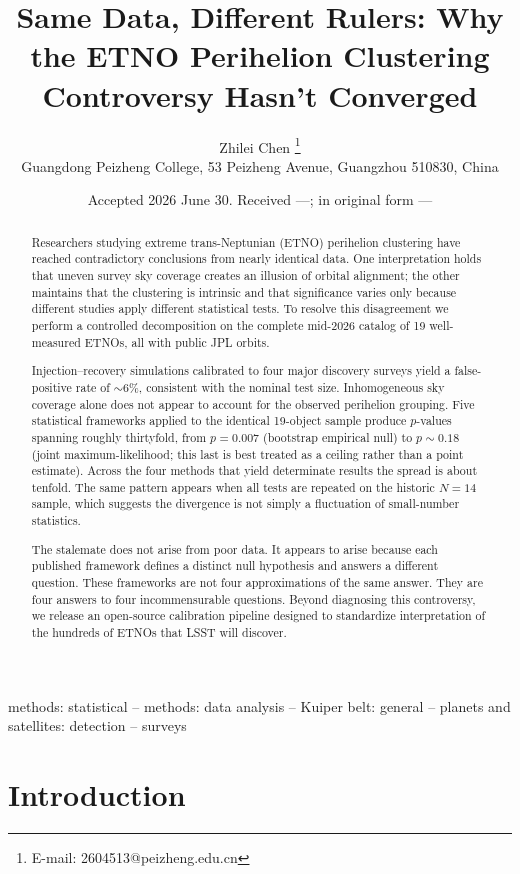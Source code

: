 \documentclass[usenatbib]{mnras}
\title{Same Data, Different Rulers: Why the ETNO Perihelion Clustering Controversy Hasn't Converged}
\author{Zhilei Chen%
\thanks{E-mail: 2604513@peizheng.edu.cn}%
\\
Guangdong Peizheng College, 53 Peizheng Avenue, Guangzhou 510830, China}
\date{Accepted 2026 June 30. Received ---; in original form ---}
\begin{document}
\maketitle

\begin{abstract}
Researchers studying extreme trans-Neptunian (ETNO) perihelion clustering have reached contradictory conclusions from nearly identical data. One interpretation holds that uneven survey sky coverage creates an illusion of orbital alignment; the other maintains that the clustering is intrinsic and that significance varies only because different studies apply different statistical tests. To resolve this disagreement we perform a controlled decomposition on the complete mid-2026 catalog of 19 well-measured ETNOs, all with public JPL orbits.

Injection--recovery simulations calibrated to four major discovery surveys yield a false-positive rate of $\sim$6\%, consistent with the nominal test size. Inhomogeneous sky coverage alone does not appear to account for the observed perihelion grouping. Five statistical frameworks applied to the identical 19-object sample produce $p$-values spanning roughly thirtyfold, from $p=0.007$ (bootstrap empirical null) to $p\sim0.18$ (joint maximum-likelihood; this last is best treated as a ceiling rather than a point estimate). Across the four methods that yield determinate results the spread is about tenfold. The same pattern appears when all tests are repeated on the historic $N=14$ sample, which suggests the divergence is not simply a fluctuation of small-number statistics.

The stalemate does not arise from poor data. It appears to arise because each published framework defines a distinct null hypothesis and answers a different question. These frameworks are not four approximations of the same answer. They are four answers to four incommensurable questions. Beyond diagnosing this controversy, we release an open-source calibration pipeline designed to standardize interpretation of the hundreds of ETNOs that LSST will discover.
\end{abstract}

\begin{keywords}
methods: statistical -- methods: data analysis -- Kuiper belt: general -- planets and satellites: detection -- surveys
\end{keywords}

\section{Introduction}
\end{document}
